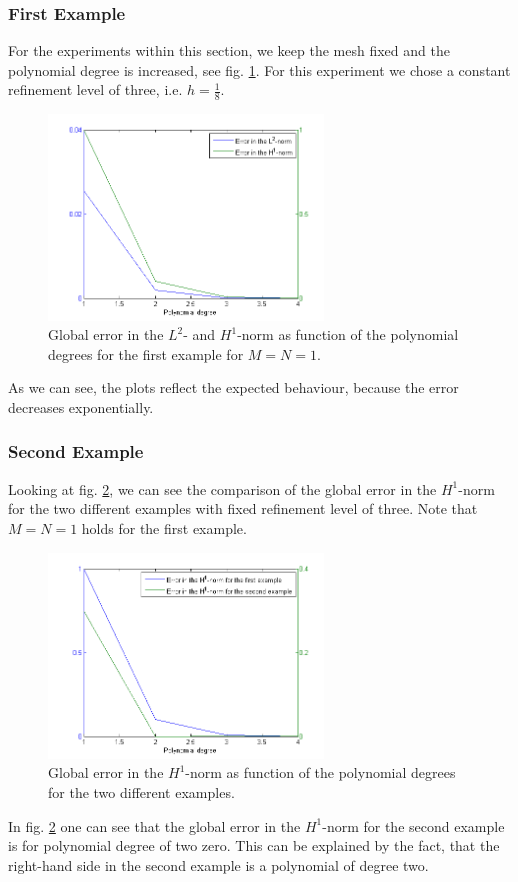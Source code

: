 \documentclass[a4paper, 11pt, twoside]{article}
\begin{document}
\subsubsection{First Example}
For the experiments within this section, we keep the mesh fixed and the polynomial degree is increased, see fig. \ref{error_polydegree_example1}. For this experiment we chose a constant refinement level of three, i.e. $h=\frac{1}{8}$.
\begin{figure}[h!]
  \centering      
  \includegraphics[width=0.65\textwidth]{fig/polyerrorf1_ref3.png}
\caption{Global error in the $L^2$- and $H^1$-norm as function of the polynomial degrees for the first example for $M = N = 1$.}
\label{error_polydegree_example1}
\end{figure}
As we can see, the plots reflect the expected behaviour, because the error decreases exponentially.
\subsubsection{Second Example}
Looking at fig. \ref{error_comparison}, we can see the comparison of the global error in the $H^1$-norm for the two different examples with fixed refinement level of three. Note that $M = N = 1$ holds for the first example.
\begin{figure}[h!]
  \centering      
  \includegraphics[width=0.65\textwidth]{fig/ComparisonH1error.png}
\caption{Global error in the $H^1$-norm as function of the polynomial degrees for the two different examples.}
\label{error_comparison}
\end{figure}
In fig. \ref{error_comparison} one can see that the global error in the $H^1$-norm for the second example is for polynomial degree of two zero. This can be explained by the fact, that the right-hand side in the second example is a polynomial of degree two.
\end{document}
